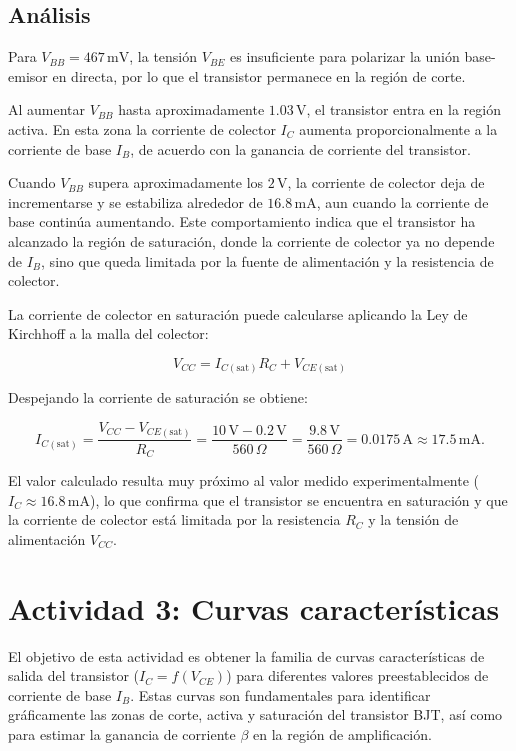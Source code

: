 \documentclass[12pt,a4paper]{article}
\begin{document}
\subsection{Análisis}

Para \(V_{BB}=467\,\text{mV}\), la tensión \(V_{BE}\) es insuficiente para polarizar la unión base-emisor en directa,
por lo que el transistor permanece en la región de corte.

Al aumentar \(V_{BB}\) hasta aproximadamente \(1.03\,\text{V}\), el transistor entra en la región activa. En esta zona
la corriente de colector \(I_C\) aumenta proporcionalmente a la corriente de base \(I_B\), de acuerdo con la ganancia de
corriente del transistor.

Cuando \(V_{BB}\) supera aproximadamente los \(2\,\text{V}\), la corriente de colector deja de incrementarse y se
estabiliza alrededor de \(16.8\,\text{mA}\), aun cuando la corriente de base continúa aumentando. Este comportamiento
indica que el transistor ha alcanzado la región de saturación, donde la corriente de colector ya no depende de \(I_B\),
sino que queda limitada por la fuente de alimentación y la resistencia de colector.

La corriente de colector en saturación puede calcularse aplicando la Ley de Kirchhoff a la malla del colector:

\begin{equation}
V_{CC}=I_{C(\mathrm{sat})}R_C+V_{CE(\mathrm{sat})}
\end{equation}

Despejando la corriente de saturación se obtiene:

\begin{equation}
I_{C(\mathrm{sat})}
=\frac{V_{CC}-V_{CE(\mathrm{sat})}}{R_C}
=\frac{10\,\mathrm{V}-0.2\,\mathrm{V}}{560\,\Omega}
=\frac{9.8\,\mathrm{V}}{560\,\Omega}
=0.0175\,\mathrm{A}
\approx17.5\,\mathrm{mA}.
\end{equation}

El valor calculado resulta muy próximo al valor medido experimentalmente (\(I_C \approx 16.8\,\text{mA}\)), lo que
confirma que el transistor se encuentra en saturación y que la corriente de colector está limitada por la resistencia
\(R_C\) y la tensión de alimentación \(V_{CC}\).

\section{Actividad 3: Curvas características}
El objetivo de esta actividad es obtener la familia de curvas características de salida del transistor ($I_C =
f(V_{CE})$) para diferentes valores preestablecidos de corriente de base $I_B$. Estas curvas son fundamentales para
identificar gráficamente las zonas de corte, activa y saturación del transistor BJT, así como para estimar la ganancia
de corriente $\beta$ en la región de amplificación.
\end{document}
